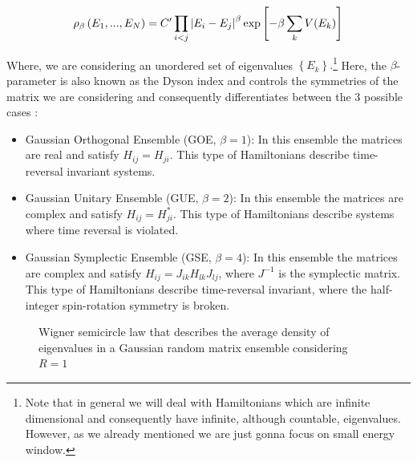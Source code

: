 \documentclass[11pt,a4paper]{article}
\begin{document}
\begin{equation}\LA{JPD_EIGEN}
    \rho_\beta\left(E_1,...,E_N\right) = C'\prod_{i<j}\left|E_i-E_j\right|^\beta \exp{\left[-\beta \sum_k V(E_k)\right]}
\end{equation}

Where, we are considering an unordered set of eigenvalues $\left\{E_k\right\}.$\footnote{Note that in general we will deal with Hamiltonians which are infinite dimensional and consequently have infinite, although countable, eigenvalues. However, as we already mentioned we are just gonna focus on small energy window.} Here, the $\beta$-parameter is also known as the Dyson index and controls the symmetries of the matrix we are considering and consequently differentiates between the 3 possible cases \cite{pandey_quantum_2019,dalessio_quantum_2016}:

\begin{itemize}
    \item Gaussian Orthogonal Ensemble (GOE, $\beta = 1$): In this ensemble the matrices are real and satisfy $H_{ij}=H_{ji}$. This type of Hamiltonians describe time-reversal invariant systems.
    \item Gaussian Unitary Ensemble (GUE, $\beta = 2$): In this ensemble the matrices are complex and satisfy $H_{ij}=H_{ji}^*$. This type of Hamiltonians describe systems where time reversal is violated.
    \item Gaussian Symplectic Ensemble (GSE, $\beta = 4$): In this ensemble the matrices are complex and satisfy $H_{ij}=J_{ik}H_{lk}J_{lj}$, where $J^{-1}$ is the symplectic matrix. This type of Hamiltonians describe time-reversal invariant, where the half-integer spin-rotation symmetry is broken.
\end{itemize}

\begin{figure}
    \centering
    \caption{Wigner semicircle law that describes the average density of eigenvalues in a Gaussian random matrix ensemble considering $R=1$}
\end{figure}
\end{document}
